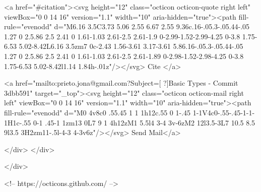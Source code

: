       <a  href="#citation"><svg height="12" class="octicon octicon-quote right left" viewBox="0 0 14 16" version="1.1" width="10" aria-hidden="true"><path fill-rule="evenodd" d="M6.16 3.5C3.73 5.06 2.55 6.67 2.55 9.36c.16-.05.3-.05.44-.05 1.27 0 2.5.86 2.5 2.41 0 1.61-1.03 2.61-2.5 2.61-1.9 0-2.99-1.52-2.99-4.25 0-3.8 1.75-6.53 5.02-8.42L6.16 3.5zm7 0c-2.43 1.56-3.61 3.17-3.61 5.86.16-.05.3-.05.44-.05 1.27 0 2.5.86 2.5 2.41 0 1.61-1.03 2.61-2.5 2.61-1.89 0-2.98-1.52-2.98-4.25 0-3.8 1.75-6.53 5.02-8.42l1.14 1.84h-.01z"/></svg> Cite
      </a>

      <a href="mailto:prieto.jona@gmail.com?Subject=[ ?]Basic Types - Commit 3dbb591" target="_top"><svg height="12" class="octicon octicon-mail right left" viewBox="0 0 14 16" version="1.1" width="10" aria-hidden="true"><path fill-rule="evenodd" d="M0 4v8c0 .55.45 1 1 1h12c.55 0 1-.45 1-1V4c0-.55-.45-1-1-1H1c-.55 0-1 .45-1 1zm13 0L7 9 1 4h12zM1 5.5l4 3-4 3v-6zM2 12l3.5-3L7 10.5 8.5 9l3.5 3H2zm11-.5l-4-3 4-3v6z"/></svg> Send Mail</a>

    </div>
  </div>

</div>

<!-- https://octicons.github.com/ -->






